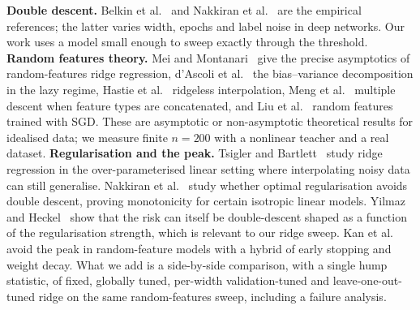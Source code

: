 \textbf{Double descent.} Belkin et al.~\cite{belkin2018reconciling} and Nakkiran et al.~\cite{nakkiran2019deep} are the empirical references; the latter varies width, epochs and label noise in deep networks. Our work uses a model small enough to sweep exactly through the threshold. \textbf{Random features theory.} Mei and Montanari~\cite{mei2019generalization} give the precise asymptotics of random-features ridge regression, d'Ascoli et al.~\cite{dascoli2020double} the bias--variance decomposition in the lazy regime, Hastie et al.~\cite{hastie2019surprises} ridgeless interpolation, Meng et al.~\cite{meng2022multiple} multiple descent when feature types are concatenated, and Liu et al.~\cite{liu2021double} random features trained with SGD. These are asymptotic or non-asymptotic theoretical results for idealised data; we measure finite $n=200$ with a nonlinear teacher and a real dataset. \textbf{Regularisation and the peak.} Tsigler and Bartlett~\cite{tsigler2020benign} study ridge regression in the over-parameterised linear setting where interpolating noisy data can still generalise. Nakkiran et al.~\cite{nakkiran2020optimal} study whether optimal regularisation avoids double descent, proving monotonicity for certain isotropic linear models. Yilmaz and Heckel~\cite{yilmaz2022regularization} show that the risk can itself be double-descent shaped as a function of the regularisation strength, which is relevant to our ridge sweep. Kan et al.~\cite{kan2020avoiding} avoid the peak in random-feature models with a hybrid of early stopping and weight decay. What we add is a side-by-side comparison, with a single hump statistic, of fixed, globally tuned, per-width validation-tuned and leave-one-out-tuned ridge on the same random-features sweep, including a failure analysis.
